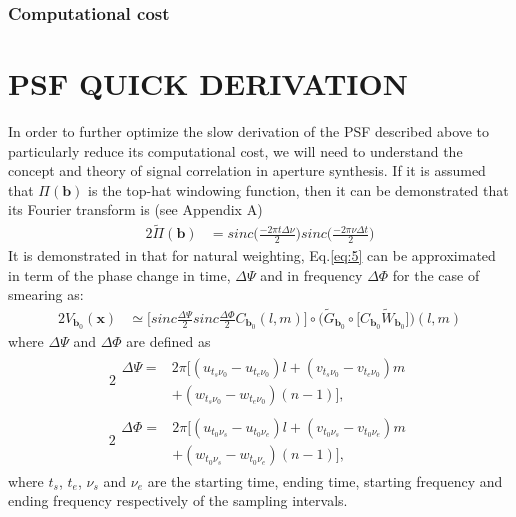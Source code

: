 \subsubsection{Computational cost} 
\section{PSF QUICK DERIVATION}
In order to further optimize the slow derivation of the PSF described above to particularly reduce its computational
cost, we will need to understand the concept and theory of signal correlation in aperture synthesis.
If it is assumed that $\Pi(\mathbf{b})$ is the top-hat windowing function, then it can be demonstrated 
that its Fourier transform is (see Appendix A)
\begin{alignat}{2}
\widetilde{\Pi}(\mathbf{b})&=sinc\Big(\frac{-2\pi t\Delta \nu}{2}\Big)sinc\Big(\frac{-2\pi\nu\Delta t}{2}\Big)
\end{alignat}
It is demonstrated in \citep{smirnov2011revisiting} that for  natural weighting, Eq.\ref{eq:5} can be
approximated in term of the
phase change in time, $\Delta \Psi$ and in frequency  $\Delta \Phi$ for the case of smearing as:
\begin{alignat}{2}
V_{\mathbf{b}_0}(\mathbf{x}) &\simeq \Big[sinc\frac{\Delta \Psi}{2}sinc\frac{\Delta \Phi}{2}C_{\mathbf{b}_0}(l,m)\Big]\circ\Bigg(\widetilde{G}_{\mathbf{b}_0}\circ\Big[C_{\mathbf{b}_0}\widetilde{W}_{\mathbf{b}_0}\Big]\Bigg)(l,m)
\end{alignat}
where $\Delta \Psi$ and $\Delta \Phi$ are  defined as
\begin{alignat}{2}
\begin{split}
\Delta \Psi =&2\pi \Big[(u_{t_s\nu_0}-u_{t_e\nu_0})l + (v_{t_s\nu_0}-v_{t_e\nu_0})m\\
	    & +(w_{t_s\nu_0}-w_{t_e\nu_0})(n-1)\Big],
\end{split}
\end{alignat}
\begin{alignat}{2}
\begin{split}
\Delta \Phi =&2\pi \Big[(u_{t_0\nu_s}-u_{t_0\nu_e})l + (v_{t_0\nu_s}-v_{t_0\nu_e})m\\
	    & +(w_{t_0\nu_s}-w_{t_0\nu_e})(n-1)\Big], \label{eq:aproxaveraging}
\end{split}	    
\end{alignat}
where $t_s$, $t_e$, $\nu_s$ and $\nu_e$ are the  
starting time, ending time, starting frequency and ending frequency respectively of the sampling intervals.\\

